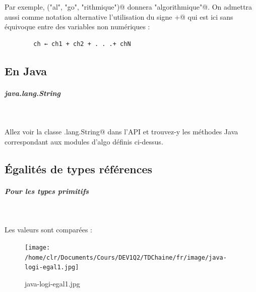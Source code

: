 \documentclass[11pt,a4paper]{article}
\begin{document}
            \par
        
        Par exemple, \verb@concat("al", "go", "rithmique")@ donnera 
        \verb@"algorithmique"@. On admettra
        aussi comme notation alternative l'utilisation du signe \guillemotleft  \verb@+@ \guillemotright  
        qui est ici sans \'equivoque entre des variables non num\'eriques :
       
            \par
        \begin{verbatim}
        ch ← ch1 + ch2 + . . .+ chN
      \end{verbatim}\subsection{En Java}
			
		\subparagraph{java.lang.String} 
		
					\textcolor{white}{.} \par
				
		    Allez voir la classe \verb@java.lang.String@ dans l'API
		    et trouvez-y les m\'ethodes Java correspondant aux modules d'algo d\'efinis ci-dessus.
		  
            \par
        
            \par
        \subsection{\'Egalit\'es de types r\'ef\'erences}
			
		\subparagraph{Pour les types primitifs} 
		
					\textcolor{white}{.} \par
				
		    Les valeurs sont compar\'ees :
		  
            \par
        \begin{figure}[hbt]
				    \begin{center}
					\texttt{[image: /home/clr/Documents/Cours/DEV1Q2/TDChaine/fr/image/java-logi-egal1.jpg]}
						\end{center}
                
                    \caption[java-logi-egal1.jpg]{java-logi-egal1.jpg}
                \end{figure}
                    
            \par
        
\end{document}
